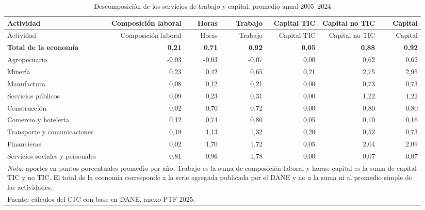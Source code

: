 \begingroup
\small
\setlength{\tabcolsep}{4pt}
\begin{longtable}{p{4.65cm}rrrrrr}
\caption{Descomposición de los servicios de trabajo y capital, promedio anual 2005--2024}
\label{tab:detalle_factores}\\
\toprule
Actividad & Composición laboral & Horas & Trabajo & Capital TIC & Capital no TIC & Capital \\
\midrule
\endfirsthead
\toprule
Actividad & Composición laboral & Horas & Trabajo & Capital TIC & Capital no TIC & Capital \\
\midrule
\endhead
\textbf{Total de la economía} & \textbf{0,21} & \textbf{0,71} & \textbf{0,92} & \textbf{0,05} & \textbf{0,88} & \textbf{0,92} \\
\midrule
Agropecuario & -0,03 & -0,03 & -0,07 & 0,00 & 0,62 & 0,62 \\
Minería & 0,23 & 0,42 & 0,65 & 0,21 & 2,75 & 2,95 \\
Manufactura & 0,08 & 0,12 & 0,21 & 0,00 & 0,73 & 0,73 \\
Servicios públicos & 0,09 & 0,23 & 0,31 & 0,00 & 1,22 & 1,22 \\
Construcción & 0,02 & 0,70 & 0,72 & 0,00 & 0,80 & 0,80 \\
Comercio y hotelería & 0,12 & 0,74 & 0,86 & 0,05 & 0,10 & 0,16 \\
Transporte y comunicaciones & 0,19 & 1,13 & 1,32 & 0,20 & 0,52 & 0,73 \\
Financieras & 0,02 & 1,70 & 1,72 & 0,05 & 2,04 & 2,09 \\
Servicios sociales y personales & 0,81 & 0,96 & 1,78 & 0,00 & 0,07 & 0,07 \\
\bottomrule
\multicolumn{7}{p{15.9cm}}{\footnotesize \textit{Nota:} aportes en puntos porcentuales promedio por año. Trabajo es la suma de composición laboral y horas; capital es la suma de capital TIC y no TIC. El total de la economía corresponde a la serie agregada publicada por el DANE y no a la suma ni al promedio simple de las actividades.}\\
\multicolumn{7}{l}{\footnotesize Fuente: cálculos del CJC con base en DANE, anexo PTF 2025.}\\
\end{longtable}
\endgroup
